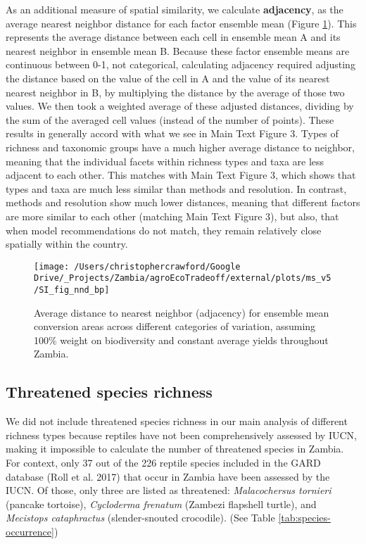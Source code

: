 \documentclass[
]{article}
\begin{document}
As an additional measure of spatial similarity, we calculate \textbf{adjacency}, as the average nearest neighbor distance for each factor ensemble mean (Figure \ref{fig:nnd-fig}). This represents the average distance between each cell in ensemble mean A and its nearest neighbor in ensemble mean B. Because these factor ensemble means are continuous between 0-1, not categorical, calculating adjacency required adjusting the distance based on the value of the cell in A and the value of its nearest nearest neighbor in B, by multiplying the distance by the average of those two values. We then took a weighted average of these adjusted distances, dividing by the sum of the averaged cell values (instead of the number of points). These results in generally accord with what we see in Main Text Figure 3. Types of richness and taxonomic groups have a much higher average distance to neighbor, meaning that the individual facets within richness types and taxa are less adjacent to each other. This matches with Main Text Figure 3, which shows that types and taxa are much less similar than methods and resolution. In contrast, methods and resolution show much lower distances, meaning that different factors are more similar to each other (matching Main Text Figure 3), but also, that when model recommendations do not match, they remain relatively close spatially within the country.



\begin{figure}
\texttt{[image: /Users/christophercrawford/Google Drive/\_Projects/Zambia/agroEcoTradeoff/external/plots/ms\_v5/SI\_fig\_nnd\_bp]} \caption{Average distance to nearest neighbor (adjacency) for ensemble mean conversion areas across different categories of variation, assuming 100\% weight on biodiversity and constant average yields throughout Zambia.}\label{fig:nnd-fig}
\end{figure}

\newpage

\hypertarget{section-threat}{%
\subsection{Threatened species richness}\label{section-threat}}

We did not include threatened species richness in our main analysis of different richness types because reptiles have not been comprehensively assessed by IUCN, making it impossible to calculate the number of threatened species in Zambia. For context, only 37 out of the 226 reptile species included in the GARD database (Roll et al. 2017) that occur in Zambia have been assessed by the IUCN. Of those, only three are listed as threatened: \emph{Malacochersus tornieri} (pancake tortoise), \emph{Cycloderma frenatum} (Zambezi flapshell turtle), and \emph{Mecistops cataphractus} (slender-snouted crocodile). (See Table \ref{tab:species-occurrence})
\end{document}
